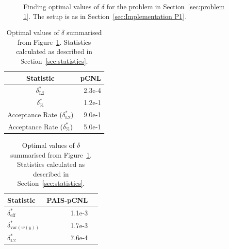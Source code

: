 \documentclass[final]{siamltex}
\begin{document}
\begin{figure}[htb]
\centering
{}
\caption{Finding optimal values of $\delta$ for the problem in Section~\ref{sec:problem 1}. The setup is as in Section~\ref{sec:Implementation P1}.}
\label{fig:P1 opt delta}
\end{figure}

\begin{table}[!htb]
    \begin{minipage}{.5\linewidth}
      \centering
        \begin{tabular}{|c|r|}
	\hline
	Statistic											& pCNL \\ \hline
	$\delta_{\text{L2}}^*$								& 2.3e-4 \\
	$\delta_{\%}^*$									& 1.2e-1 \\
	Acceptance Rate ($\delta_{\text{L2}}^*$)				& 9.0e-1 \\
	Acceptance Rate ($\delta_{\%}^*$)					& 5.0e-1 \\
	\hline
	\end{tabular}
    \end{minipage}%
    \begin{minipage}{.5\linewidth}
      \centering
        \begin{tabular}{|l|r|r|}
	\hline
	Statistic							& PAIS-pCNL \\ \hline
	$\delta_{\text{eff}}^*$				& 1.1e-3 \\
	$\delta_{\text{var}(w(y))}^*$			& 1.7e-3 \\
	$\delta_{\text{L2}}^*$				& 7.6e-4 \\
	\hline
	\end{tabular}
    \end{minipage}
	\vspace{1mm}
	\caption{Optimal values of $\delta$ summarised from Figure~\ref{fig:P1 opt delta}. Statistics calculated as described in Section~\ref{sec:statistics}.}
	\label{table:prob1 opt delta}
\end{table}
\end{document}
